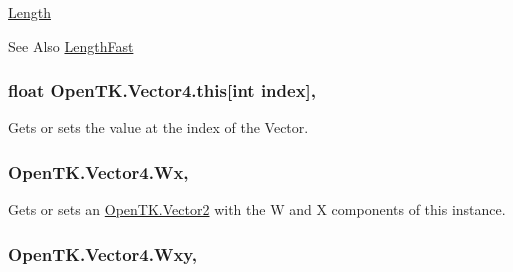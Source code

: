 \hyperlink{struct_open_t_k_1_1_vector4_a5ebc615641557a752cfe160608f09832}{Length} \begin{DoxySeeAlso}{See Also}
\hyperlink{struct_open_t_k_1_1_vector4_a3bebfd9daf625e3da63f9a734544e0c9}{Length\-Fast}


\end{DoxySeeAlso}
\hypertarget{struct_open_t_k_1_1_vector4_a3d4906d6868ab36424bb334288838adb}{
\subsubsection[{this[int index]}]{\setlength{\rightskip}{0pt plus 5cm}float Open\-T\-K.\-Vector4.\-this\mbox{[}int index\mbox{]}\hspace{0.3cm}{\ttfamily [get]}, {\ttfamily [set]}}}\label{struct_open_t_k_1_1_vector4_a3d4906d6868ab36424bb334288838adb}


Gets or sets the value at the index of the Vector. 

\hypertarget{struct_open_t_k_1_1_vector4_a755c295f62f2d11e38e2c0b451b2da19}{
\subsubsection[{Wx}]{ Open\-T\-K.\-Vector4.\-Wx\hspace{0.3cm}{\ttfamily [get]}, {\ttfamily [set]}}}\label{struct_open_t_k_1_1_vector4_a755c295f62f2d11e38e2c0b451b2da19}


Gets or sets an \hyperlink{struct_open_t_k_1_1_vector2}{Open\-T\-K.\-Vector2} with the W and X components of this instance. 

\hypertarget{struct_open_t_k_1_1_vector4_a807d0c7618a918e3b3fffea9639bba41}{
\subsubsection[{Wxy}]{ Open\-T\-K.\-Vector4.\-Wxy\hspace{0.3cm}{\ttfamily [get]}, {\ttfamily [set]}}}\label{struct_open_t_k_1_1_vector4_a807d0c7618a918e3b3fffea9639bba41}


